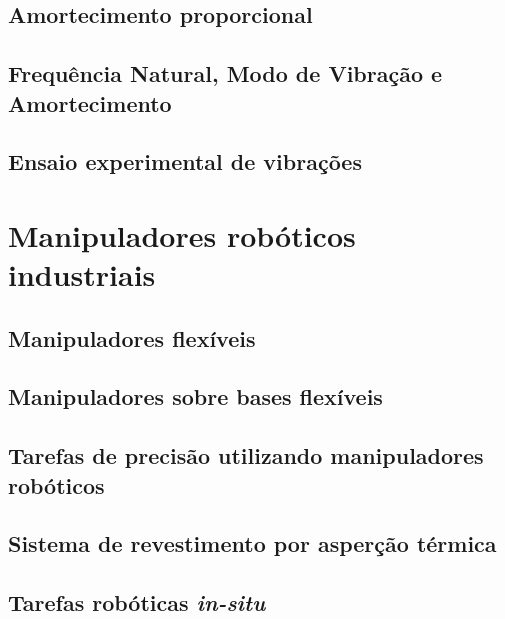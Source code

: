 \subsection{Amortecimento proporcional} \label{sec::amortecimento}

\subsection{Frequência Natural, Modo de Vibração e Amortecimento}
\label{sec::param_mod}

\subsection{Ensaio experimental de vibrações}


\section{Manipuladores robóticos industriais}\label{sec::manind}

\subsection{Manipuladores flexíveis}

\subsection{Manipuladores sobre bases flexíveis}

\subsection{Tarefas de precisão utilizando manipuladores robóticos}

\subsection{Sistema de revestimento por asperção térmica} \label{sec::hvof}

\subsection{Tarefas robóticas \textit{in-situ}} \label{sec::insitu}



